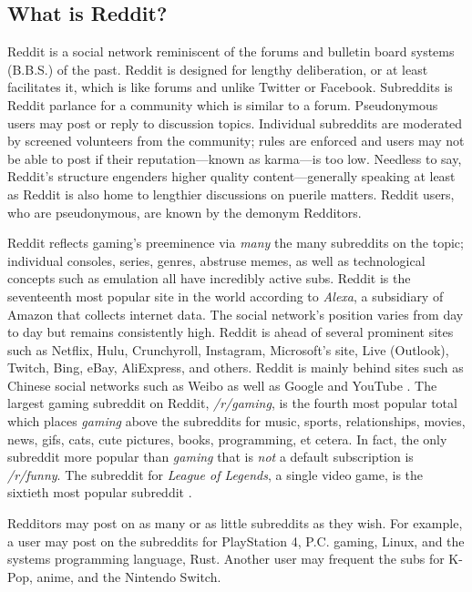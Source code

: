 \documentclass[12pt, a4paper]{article}
\begin{document}
\subsection{What is Reddit?}
Reddit is a social network reminiscent of the forums and bulletin board systems (B.B.S.) of the past. Reddit is designed for lengthy deliberation, or at least facilitates it, which is like forums and unlike Twitter or Facebook. Subreddits is Reddit parlance for a community which is similar to a forum. Pseudonymous users may post or reply to discussion topics. Individual subreddits are moderated by screened volunteers from the community; rules are enforced and users may not be able to post if their reputation---known as karma---is too low. Needless to say, Reddit's structure engenders higher quality content---generally speaking at least as Reddit is also home to lengthier discussions on puerile matters. Reddit users, who are pseudonymous, are known by the demonym Redditors.

Reddit reflects gaming's preeminence via \textit{many} the many subreddits on the topic; individual consoles, series, genres, abstruse memes, as well as technological concepts such as emulation all have incredibly active subs. Reddit is the seventeenth most popular site in the world according to \textit{Alexa}, a subsidiary of Amazon that collects internet data. The social network's position varies from day to day but remains consistently high. Reddit is ahead of several prominent sites such as Netflix, Hulu, Crunchyroll, Instagram, Microsoft's site, Live (Outlook), Twitch, Bing, eBay, AliExpress, and others. Reddit is mainly behind sites such as Chinese social networks such as Weibo as well as Google and YouTube \cite{alexatop}. The largest gaming subreddit on Reddit, \textit{/r/gaming}, is the fourth most popular total which places \textit{gaming} above the subreddits for music, sports, relationships, movies, news, gifs, cats, cute pictures, books, programming, et cetera. In fact, the only subreddit more popular than \textit{gaming} that is \textit{not} a default subscription is \textit{/r/funny}. The subreddit for \textit{League of Legends}, a single video game, is the sixtieth most popular subreddit \cite{redditlist}.

Redditors may post on as many or as little subreddits as they wish. For example, a user may post on the subreddits for PlayStation 4, P.C. gaming, Linux, and the systems programming language, Rust. Another user may frequent the subs for K-Pop, anime, and the Nintendo Switch.
\end{document}
